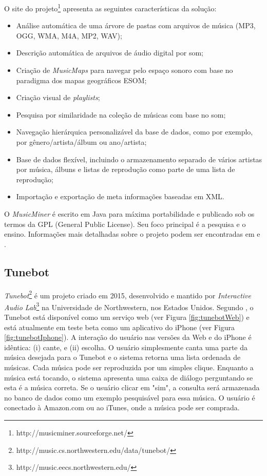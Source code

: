 O site do projeto\footnote{http://musicminer.sourceforge.net/}  apresenta as seguintes características da solução:

\begin{itemize}
    \item Análise automática de uma árvore de pastas com arquivos de música (MP3, OGG, WMA, M4A, MP2, WAV);
    \item Descrição automática de arquivos de áudio digital por som;
    \item Criação de \textit{MusicMaps} para navegar pelo espaço sonoro com base no paradigma dos mapas geográficos ESOM;
    \item Criação visual de \textit{playlists};
    \item Pesquisa por similaridade na coleção de músicas com base no som;
    \item Navegação hierárquica personalizável da base de dados, como por exemplo, por gênero/artista/álbum ou ano/artista;
    \item Base de dados flexível, incluindo o armazenamento separado de vários artistas por música, álbuns e listas de reprodução como parte de uma lista de reprodução;
    \item Importação e exportação de meta informações baseadas em XML.
\end{itemize}

O \textit{MusicMiner} é escrito em Java para máxima portabilidade e publicado sob os termos da GPL (General Public License). Seu foco principal é a pesquisa e o ensino. Informações mais detalhadas sobre o projeto podem ser encontradas em \cite{morchen2005} e \cite{musicminer}.

\subsection{Tunebot} \label{subsec:tunebot}
\textit{Tunebot}\footnote{http://music.cs.northwestern.edu/data/tunebot/} é um projeto criado em 2015, desenvolvido e mantido por \textit{Interactive Audio Lab}\footnote{http://music.eecs.northwestern.edu/} na Universidade de Northwestern, nos Estados Unidos. Segundo , o Tunebot está disponível como um serviço web (ver Figura \ref{fig:tunebotWeb}) e está atualmente em teste beta como um aplicativo do iPhone (ver Figura \ref{fig:tunebotIphone}). A interação do usuário nas versões da Web e do iPhone é idêntica:
(i) cante, e (ii) escolha. O usuário simplesmente canta uma parte da música desejada para o Tunebot e o sistema retorna uma lista ordenada de músicas. Cada música pode ser reproduzida por um simples clique. Enquanto a música está tocando, o sistema apresenta uma caixa de diálogo perguntando se esta é a música correta. Se o usuário clicar em "sim", a consulta será armazenada no banco de dados como um exemplo pesquisável para essa música. O usuário é conectado à Amazon.com ou ao iTunes, onde a música pode ser comprada.

